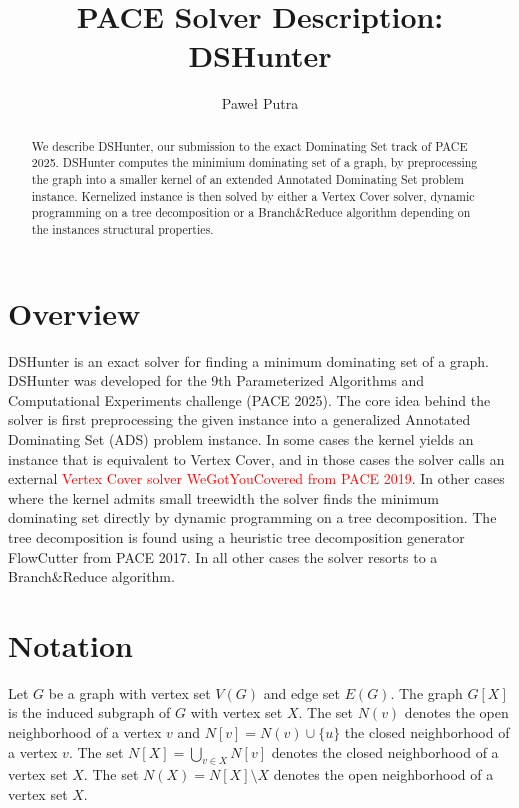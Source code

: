 \documentclass[a4paper,UKenglish,cleveref, autoref, thm-restate]{lipics-v2021}
\title{PACE Solver Description: DSHunter} %
\author{Paweł Putra}{University of Warsaw, Poland }{pawelputra0@gmail.com}{}{}%
\begin{document}
\maketitle

\begin{abstract}
We describe DSHunter, our submission to the exact Dominating Set track of PACE 2025. DSHunter computes the minimium dominating set of a graph, by preprocessing the graph
into a smaller kernel of an extended Annotated Dominating Set problem instance. 
Kernelized instance is then solved by either a Vertex Cover solver, dynamic programming on a tree decomposition or a Branch\&Reduce algorithm depending on the instances structural properties.
\end{abstract}

\section{Overview}
\label{sec:overview}

DSHunter is an exact solver for finding a minimum dominating set of a graph. DSHunter was developed for the 9th Parameterized Algorithms and Computational Experiments challenge (PACE 2025).
The core idea behind the solver is first preprocessing the given instance into a generalized Annotated Dominating Set (ADS) problem instance.
In some cases the kernel yields an instance that is equivalent to Vertex Cover, and in those cases the solver calls an external \textcolor{red}{Vertex Cover solver WeGotYouCovered\cite{DBLP:conf/siamcsc/HespeL0S20} from PACE 2019}.
In other cases where the kernel admits small treewidth the solver finds the minimum dominating set directly by dynamic programming on a tree decomposition.
The tree decomposition is found using a heuristic tree decomposition generator  FlowCutter\cite{DBLP:conf/alenex/HamannS16} from PACE 2017.
In all other cases the solver resorts to a Branch\&Reduce algorithm.


\section{Notation}

Let $G$ be a graph with vertex set $V(G)$ and edge set $E(G)$. The graph $G[X]$ is the induced subgraph of $G$ with vertex set $X$.
The set $N(v)$ denotes the open neighborhood of a vertex $v$ and $N[v] = N(v) \cup \{u\}$ the closed neighborhood of a vertex $v$.
The set $N[X] = \bigcup_{v \in X} N[v]$ denotes the closed neighborhood of a vertex set $X$.
The set $N(X) = N[X] \setminus X$ denotes the open neighborhood of a vertex set $X$.
\end{document}
